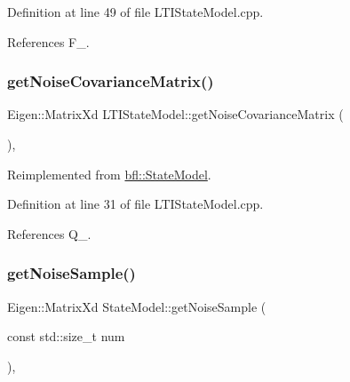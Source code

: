 Definition at line 49 of file L\+T\+I\+State\+Model.\+cpp.



References F\+\_\+.

\mbox{\label{classbfl_1_1LTIStateModel_a60a5ab5f3013b771ddd73787edd8dcde}} 
\subsubsection{\texorpdfstring{get\+Noise\+Covariance\+Matrix()}{getNoiseCovarianceMatrix()}}
{\footnotesize\ttfamily Eigen\+::\+Matrix\+Xd L\+T\+I\+State\+Model\+::get\+Noise\+Covariance\+Matrix (\begin{DoxyParamCaption}{ }\end{DoxyParamCaption})\hspace{0.3cm}{\ttfamily [override]}, {\ttfamily [virtual]}}



Reimplemented from \mbox{\hyperlink{classbfl_1_1StateModel_a423c1fa86b9d60c8663dedc6cdcae276}{bfl\+::\+State\+Model}}.



Definition at line 31 of file L\+T\+I\+State\+Model.\+cpp.



References Q\+\_\+.

\mbox{\label{classbfl_1_1StateModel_acc6733af2dcba2a330bf7c59c3725e42}} 
\subsubsection{\texorpdfstring{get\+Noise\+Sample()}{getNoiseSample()}}
{\footnotesize\ttfamily Eigen\+::\+Matrix\+Xd State\+Model\+::get\+Noise\+Sample (\begin{DoxyParamCaption}\item[{const std\+::size\+\_\+t}]{num }\end{DoxyParamCaption})\hspace{0.3cm}{\ttfamily [virtual]}, {\ttfamily [inherited]}}



